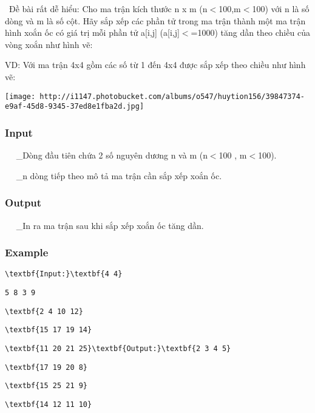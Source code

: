 

 Đề bài rất dễ hiểu: Cho ma trận kích thước n x m (n$<$100,m$<$100) với n là số dòng và m là số cột. Hãy sắp xếp các phần tử trong ma trận thành một ma trận hình xoắn ốc có giá trị mỗi phần tử a[i,j] (a[i,j]$<$=1000) tăng dần theo chiều của vòng xoắn như hình vẽ:

VD: Với ma trận 4x4 gồm các số từ 1 đến 4x4 được sắp xếp theo chiều như hình vẽ:


\texttt{[image: http://i1147.photobucket.com/albums/o547/huytion156/39847374-e9af-45d8-9345-37ed8e1fba2d.jpg]}

\subsubsection{Input}

   \_Dòng đầu tiên chứa 2 số nguyên dương n và m (n$<$100 , m$<$100).

   \_n dòng tiếp theo mô tả ma trận cần sắp xếp xoắn ốc.

\subsubsection{Output}

   \_In ra ma trận sau khi sắp xếp xoắn ốc tăng dần.

\subsubsection{Example}
\begin{verbatim}
\textbf{Input:}\textbf{4 4}\end{verbatim}
\begin{verbatim}
5 8 3 9\end{verbatim}
\begin{verbatim}
\textbf{2 4 10 12}\end{verbatim}
\begin{verbatim}
\textbf{15 17 19 14}\end{verbatim}
\begin{verbatim}
\textbf{11 20 21 25}\textbf{Output:}\textbf{2 3 4 5}\end{verbatim}
\begin{verbatim}
\textbf{17 19 20 8}\end{verbatim}
\begin{verbatim}
\textbf{15 25 21 9}\end{verbatim}
\begin{verbatim}
\textbf{14 12 11 10}\end{verbatim}